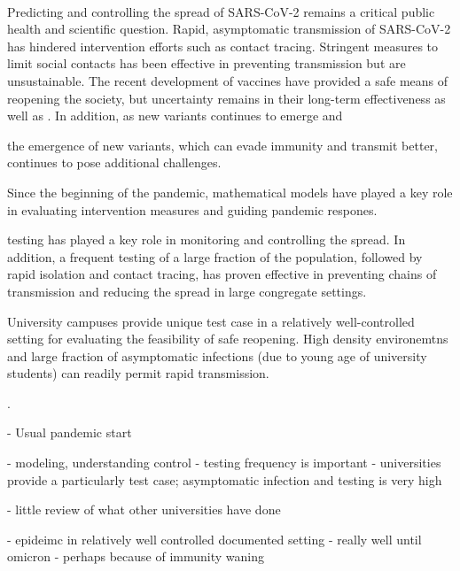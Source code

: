 \documentclass[12pt]{article}
\date{\today}
\begin{document}
\begin{flushleft}{
	\Large
	\textbf{}
}
\newline
\\ 

\end{flushleft} 

\pagebreak

Predicting and controlling the spread of SARS-CoV-2 remains a critical public health and scientific question.
Rapid, asymptomatic transmission of SARS-CoV-2 has hindered intervention efforts such as contact tracing.
Stringent measures to limit social contacts has been effective in preventing transmission but are unsustainable.
The recent development of vaccines have provided a safe means of reopening the society, but uncertainty remains in their long-term effectiveness as well as .
In addition, as new variants continues to emerge and 

the emergence of new variants, which can evade immunity and transmit better, continues to pose additional challenges.


Since the beginning of the pandemic, mathematical models have played a key role in evaluating intervention measures and guiding pandemic respones.



testing has played a key role in monitoring and controlling the spread.
In addition, a frequent testing of a large fraction of the population, followed by rapid isolation and contact tracing, has proven effective in preventing chains of transmission and reducing the spread in large congregate settings.

University campuses provide unique test case in a relatively well-controlled setting for evaluating the feasibility of safe reopening.
High density environemtns and large fraction of asymptomatic infections (due to young age of university students) can readily permit rapid transmission.

.


- Usual pandemic start

- modeling, understanding control
- testing frequency is important
- universities provide a particularly test case; asymptomatic infection and testing is very high

- little review of what other universities have done

- epideimc in relatively well controlled documented setting
- really well until omicron
- perhaps because of immunity waning 
\end{document}
